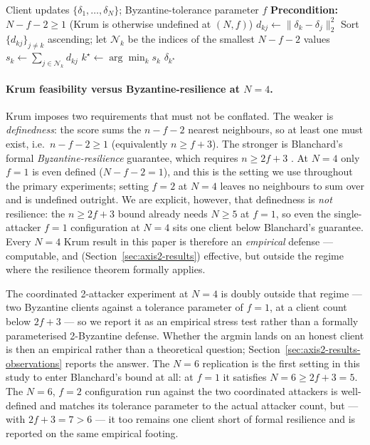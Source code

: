 \documentclass[a4paper,fleqn,doubleblind]{cas-sc}
\begin{document}
\begin{algorithm}[!ht]
\caption{Krum aggregation with Byzantine tolerance $f$.}
\label{alg:krum}
\begin{algorithmic}[1]
\Require Client updates $\{\delta_1, \ldots, \delta_N\}$; Byzantine-tolerance parameter $f$
\Statex \textbf{Precondition:} $N - f - 2 \geq 1$ (Krum is otherwise undefined at $(N, f)$)
        \State $d_{kj} \gets \| \delta_k - \delta_j \|_2^2$
    \EndFor
    \State Sort $\{d_{kj}\}_{j \neq k}$ ascending; let $\mathcal{N}_k$ be the indices of the smallest $N - f - 2$ values
    \State $s_k \gets \sum_{j \in \mathcal{N}_k} d_{kj}$ 
\EndFor
\State $k^\star \gets \arg\min_k s_k$
\State \Return $\delta_{k^\star}$ 
\end{algorithmic}
\end{algorithm}

\paragraph{Krum feasibility versus Byzantine-resilience at $N = 4$.}
Krum imposes two requirements that must not be conflated. The weaker
is \emph{definedness}: the score sums the $n - f - 2$ nearest
neighbours, so at least one must exist, i.e.\ $n - f - 2 \geq 1$
(equivalently $n \geq f + 3$). The stronger is Blanchard's formal
\emph{Byzantine-resilience} guarantee, which requires
$n \geq 2f + 3$ \citep{Blanchard2017Krum}. At $N = 4$ only $f = 1$
is even defined ($N - f - 2 = 1$), and this is the setting we use
throughout the primary experiments; setting $f = 2$ at $N = 4$ leaves
no neighbours to sum over and is undefined outright. We are explicit,
however, that definedness is \emph{not} resilience: the
$n \geq 2f + 3$ bound already needs $N \geq 5$ at $f = 1$, so even the
single-attacker $f = 1$ configuration at $N = 4$ sits one client below
Blanchard's guarantee. Every $N = 4$ Krum result in this paper is
therefore an \emph{empirical} defense --- computable, and
(Section~\ref{sec:axis2-results}) effective, but outside the regime
where the resilience theorem formally applies.

The coordinated 2-attacker experiment at $N = 4$ is doubly outside
that regime --- two Byzantine clients against a tolerance parameter of
$f = 1$, at a client count below $2f + 3$ --- so we report it as an
empirical stress test rather than a formally parameterised 2-Byzantine
defense. Whether the argmin lands on an honest client is then an
empirical rather than a theoretical question;
Section~\ref{sec:axis2-results-observations} reports the answer. The
$N = 6$ replication is the first setting in this study to enter
Blanchard's bound at all: at $f = 1$ it satisfies
$N = 6 \geq 2f + 3 = 5$. The $N = 6$, $f = 2$ configuration run against
the two coordinated attackers is well-defined and matches its tolerance
parameter to the actual attacker count, but --- with $2f + 3 = 7 > 6$
--- it too remains one client short of formal resilience and is
reported on the same empirical footing.
\end{document}
